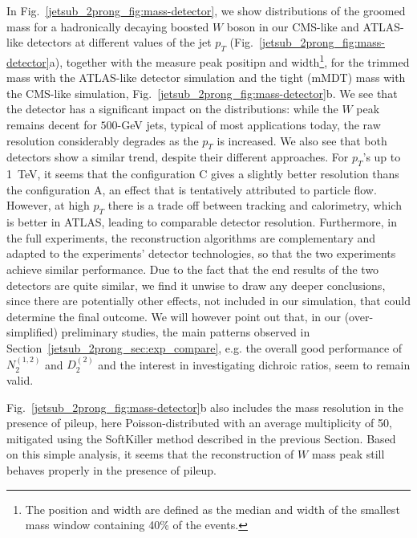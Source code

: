 \documentclass[11pt]{cernrep}
\begin{document}
In Fig.~\ref{jetsub_2prong_fig:mass-detector}, we show distributions
of the groomed mass for a hadronically decaying boosted $W$ boson in
our CMS-like and ATLAS-like detectors at different values of the jet
$p_T$ (Fig.~\ref{jetsub_2prong_fig:mass-detector}a), together with
the measure peak positipn and width\footnote{The position and width
  are defined as the median and width of the smallest mass window
  containing 40\% of the events.}, for the trimmed mass with the
ATLAS-like detector simulation and the tight (mMDT) mass with the
CMS-like simulation, Fig.~\ref{jetsub_2prong_fig:mass-detector}b.
%
We see that the detector has a significant impact on the
distributions: while the $W$ peak remains decent for $500$-GeV jets,
typical of most applications today, the raw resolution considerably
degrades as the $p_T$ is increased.
%
We also see that both detectors show a similar trend, despite their
different approaches.
%
For $p_T$'s up to 1~TeV, it seems that the configuration C gives a
slightly better resolution thans the configuration A, an effect that
is tentatively attributed to particle flow.
%
However, at high $p_T$ there is a trade off between tracking and
calorimetry, which is better in ATLAS, leading to comparable detector
resolution.
%
Furthermore, in the full experiments, the reconstruction algorithms
are complementary and adapted to the experiments' detector
technologies, so that the two experiments achieve similar performance.
%
Due to the fact that the end results of the two detectors are quite
similar, we find it unwise to draw any deeper conclusions, since there
are potentially other effects, not included in our simulation, that
could determine the final outcome.
%
We will however point out that, in our (over-simplified) preliminary
studies, the main patterns observed in
Section~\ref{jetsub_2prong_sec:exp_compare}, e.g. the overall good
performance of $N_2^{(1,2)}$ and $D_2^{(2)}$ and the interest in
investigating dichroic ratios, seem to remain valid.

Fig.~\ref{jetsub_2prong_fig:mass-detector}b also includes the mass
resolution in the presence of pileup, here Poisson-distributed with an
average multiplicity of 50, mitigated using the SoftKiller method
described in the previous Section. Based on this simple analysis, it
seems that the reconstruction of $W$ mass peak still behaves properly
in the presence of pileup.
\end{document}
